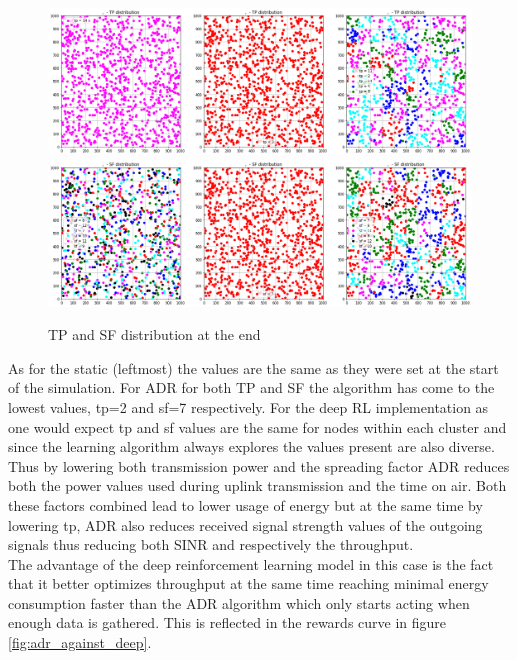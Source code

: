 \begin{figure}[H]
\centering
\hspace*{-1.2cm}  
\includegraphics[scale=0.35]{plots/adr/adr_inspection_tp_distro.png} \\
\hspace*{-1.2cm}  
\includegraphics[scale=0.35]{plots/adr/adr_inspection_sf_distro.png} \\
  \caption{TP and SF distribution at the end}
\end{figure}

As for the static (leftmost) the values are the same as 
they were set at the start of the simulation. For ADR for 
both TP and SF the algorithm has come to the lowest values, tp=2 and sf=7 respectively. For the deep RL 
implementation as one would expect tp and sf values
are the same for nodes within each cluster and since
the learning algorithm always explores the values present
are also diverse. \\

Thus by lowering both transmission power and the spreading
factor ADR reduces both the power values used during 
uplink transmission and the time on air. Both these factors combined lead to lower usage of energy but at the
same time by lowering tp, ADR also reduces received
signal strength values of the outgoing signals thus 
reducing both SINR and respectively the throughput.\\

The advantage of the deep reinforcement learning model
in this case is the fact that it better optimizes 
throughput at the same time reaching minimal energy 
consumption faster than the ADR algorithm which only 
starts acting when enough data is gathered. This is 
reflected in the rewards curve in figure 
\ref{fig:adr_against_deep}.



